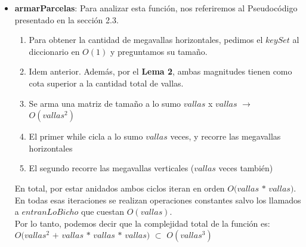 \begin{itemize}
\begin{itemize}
 \item \textbf{armarParcelas}: Para analizar esta función, nos referiremos al
Pseudocódigo presentado en la sección 2.3.	
 \begin{enumerate}
	\item Para obtener la cantidad de megavallas horizontales, pedimos el $keySet$ al diccionario en $O(1)$ y preguntamos su tamaño.
	\item Idem anterior. Además, por el \textbf{Lema 2}, ambas magnitudes tienen como cota superior a la cantidad total de vallas.
	\item Se arma una matriz de tamaño a lo sumo $vallas$ x $vallas$ $\rightarrow$ $O(vallas^2)$
  	\item El primer while cicla a lo sumo $vallas$ veces, y recorre las megavallas horizontales		
	\item El segundo recorre las megavallas verticales ($vallas$ veces también)
 \end{enumerate}


\indent En total, por estar anidados ambos ciclos iteran en orden $O(vallas$ $*$ $vallas)$. En todas esas iteraciones se realizan operaciones constantes salvo los llamados a $entranLoBicho$ que cuestan $O(vallas)$.\\
 \indent Por lo tanto, podemos decir que la complejidad total de la función
es:\\ $O(vallas^2$ $+$ $vallas$ $*$ $vallas$ $*$ $vallas)$ $\subset$
$O(vallas^3)$

\end{itemize}


\end{itemize}
